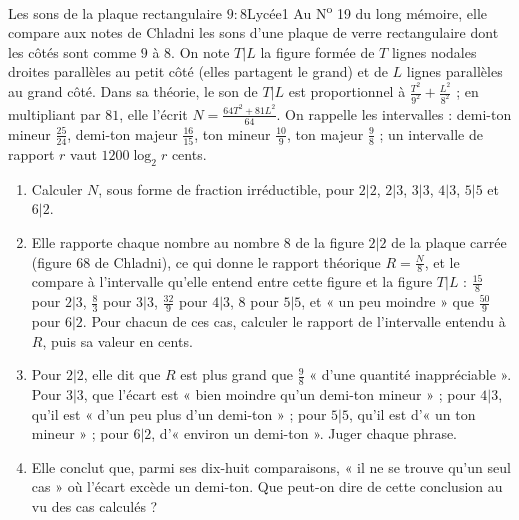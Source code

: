\documentclass[11pt,a4paper]{article}
\begin{document}
\begin{exercice}{Les sons de la plaque rectangulaire $9 : 8$}{Lycée}{1}
Au N\textsuperscript{o} 19 du long mémoire, elle compare aux notes de Chladni les sons
d'une plaque de verre rectangulaire dont les côtés sont comme $9$ à $8$. On note $T|L$
la figure formée de $T$ lignes nodales droites parallèles au petit côté (elles
partagent le grand) et de $L$ lignes parallèles au grand côté. Dans sa théorie, le son
de $T|L$ est proportionnel à $\frac{T^2}{9^2} + \frac{L^2}{8^2}$ ; en multipliant par
$81$, elle l'écrit $N = \frac{64T^2 + 81L^2}{64}$. On rappelle les intervalles : demi-ton
mineur $\frac{25}{24}$, demi-ton majeur $\frac{16}{15}$, ton mineur $\frac{10}{9}$, ton
majeur $\frac98$ ; un intervalle de rapport $r$ vaut $1200\log_2 r$ cents.


\begin{enumerate}
\item Calculer $N$, sous forme de fraction irréductible, pour $2|2$, $2|3$, $3|3$,
  $4|3$, $5|5$ et $6|2$.
\item Elle rapporte chaque nombre au nombre $8$ de la figure $2|2$ de la plaque carrée
  (figure 68 de Chladni), ce qui donne le rapport théorique $R = \frac N8$, et le compare
  à l'intervalle qu'elle entend entre cette figure et la figure $T|L$ : $\frac{15}{8}$
  pour $2|3$, $\frac83$ pour $3|3$, $\frac{32}{9}$ pour $4|3$, $8$ pour $5|5$, et « un
  peu moindre » que $\frac{50}{9}$ pour $6|2$. Pour chacun de ces cas, calculer le
  rapport de l'intervalle entendu à $R$, puis sa valeur en cents.
\item Pour $2|2$, elle dit que $R$ est plus grand que $\frac98$ « d'une quantité
  inappréciable ». Pour $3|3$, que l'écart est « bien moindre qu'un demi-ton mineur » ;
  pour $4|3$, qu'il est « d'un peu plus d'un demi-ton » ; pour $5|5$, qu'il est d'« un
  ton mineur » ; pour $6|2$, d'« environ un demi-ton ». Juger chaque phrase.
\item Elle conclut que, parmi ses dix-huit comparaisons, « il ne se trouve qu'un seul
  cas » où l'écart excède un demi-ton. Que peut-on dire de cette conclusion au vu des
  cas calculés ?
\end{enumerate}
\end{exercice}
\end{document}
